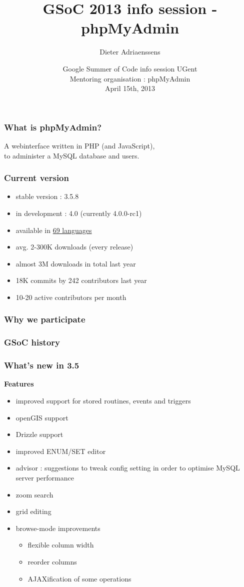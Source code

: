 \documentclass[14pt]{beamer}
\title{GSoC 2013 info session - phpMyAdmin}
\author{Dieter Adriaenssens}
\institute[phpMyAdmin]{phpMyAdmin developer}
\date[15Apr2013]{Google Summer of Code info session UGent\\
Mentoring organisation : phpMyAdmin\\
April 15th, 2013}
\begin{document}
  \begin{frame}
  \titlepage
  \end{frame}
  \begin{frame}
    \frametitle{What is phpMyAdmin?}
      A webinterface written in PHP (and JavaScript),\\
      to administer a MySQL database and users.
  \end{frame}
  \begin{frame}
    \frametitle{Current version}
    \begin{itemize}
      \item stable version : 3.5.8
      \item in development : 4.0 (currently 4.0.0-rc1)
      \item available in \href{http://www.phpmyadmin.net/home\_page/translations.php}{69 languages}
      \item avg. 2-300K downloads (every release)
      \item almost 3M downloads in total last year
      \item 18K commits by 242 contributors last year
      \item 10-20 active contributors per month
    \end{itemize}
  \end{frame}
  \begin{frame}
    \frametitle{Why we participate}
  \end{frame}
  \begin{frame}
    \frametitle{GSoC history}
  \end{frame}
  \begin{frame}
    \frametitle{What's new in 3.5}
   \textbf{{\color{PmaOlive}Features}}
    \begin{itemize}
      \item improved support for stored routines, events and triggers
      \item openGIS support
      \item Drizzle support
      \item improved ENUM/SET editor
      \item advisor : suggestions to tweak config setting in order to optimise MySQL server performance
      \item zoom search
      \item grid editing
      \item browse-mode improvements
      \begin{itemize}
        \item flexible column width
        \item reorder columns
        \item AJAXification of some operations
      \end{itemize}
    \end{itemize}
  \end{frame}
\end{document}
